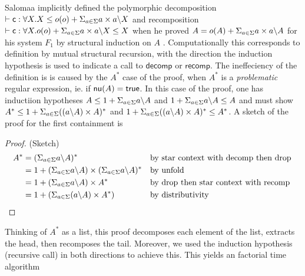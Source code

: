 \begin{example}
Salomaa implicitly defined the polymorphic decomposition $\vdash \mathsf{c} : \forall X. X \leq o(o) + \Sigma_{a \in \Sigma} a\times a \backslash X$ and recomposition $\vdash \mathsf{c} : \forall X.o(o) + \Sigma_{a \in \Sigma} a\times a \backslash X \leq X$ when he proved $A = o(A) + \Sigma_{a \in \Sigma} a\times a \backslash A$ for his system $F_1$ by structural induction on $A$ . Computationally this corresponds to definition by mutual structural recursion, with the direction the induction hypothesis is used to indicate a call to $\mathsf{decomp}$ or $\mathsf{recomp}$. The ineffeciency of the definition is is caused by the $A^*$ case of the proof, when  $A^*$ is a \textit{problematic} regular expression, ie. if $\mathsf{nu}(A) = \textsf{true}$. In this case of the proof, one has inductiion hypotheses $A \leq 1 + \Sigma_{a \in \Sigma} a \backslash A$ and  $1 + \Sigma_{a \in \Sigma} a \backslash A \leq A$ and must show $A^* \leq 1  + \Sigma_{a \in \Sigma} ((a \backslash A)\times A)^*$ and  $1  + \Sigma_{a \in \Sigma} ((a \backslash A)\times A)^* \leq A^*$. A sketch of the proof for the first containment is
\begin{proof} (Sketch)
\begin{align}
A^* &= ( \Sigma_{a \in \Sigma} a \backslash A)^* &&\text{by star context with decomp then drop}\\
 &= 1 + (\Sigma_{a \in \Sigma} a \backslash A) \times (\Sigma_{a \in \Sigma} a \backslash A)^* &&\text{by unfold}\\
 &= 1 + (\Sigma_{a \in \Sigma} a \backslash A) \times A^* && \text{by drop then star context with recomp } \\
 &= 1 + (\Sigma_{a \in \Sigma} (a \backslash A) \times A^*) && \text{by distributivity }
\end{align}
\end{proof}
Thinking of $A^*$ as a list, this proof decomposes each element of the list, extracts the head, then recomposes the tail. Moreover, we used the induction hypothesis (recursive call) in both directions to achieve this. This yields an factorial time algorithm 
\end{example}
